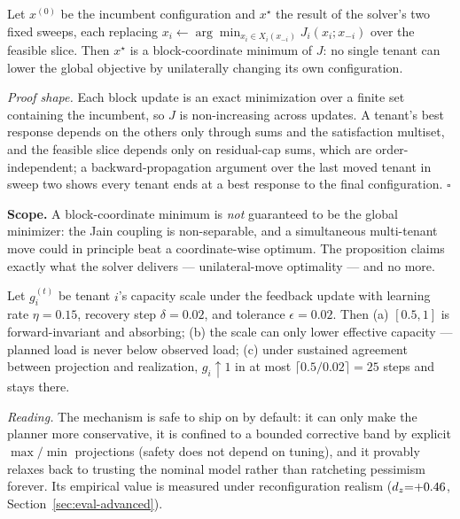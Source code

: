 \begin{proposition}
\label{prop:bco}
Let $x^{(0)}$ be the incumbent configuration and $x^\star$ the result of the
solver's two fixed sweeps, each replacing
$x_i\leftarrow\arg\min_{x_i\in X_i(x_{-i})}J_i(x_i;x_{-i})$ over the feasible
slice. Then $x^\star$ is a block-coordinate minimum of $J$: no single tenant
can lower the global objective by unilaterally changing its own
configuration.
\end{proposition}

\emph{Proof shape.} Each block update is an exact minimization over a finite
set containing the incumbent, so $J$ is non-increasing across updates.
A tenant's best response depends on the others only through sums and the
satisfaction multiset, and the feasible slice depends only on residual-cap
sums, which are order-independent; a backward-propagation argument over the
last moved tenant in sweep two shows every tenant ends at a best response to
the final configuration. $\square$

\textbf{Scope.} A block-coordinate minimum is \emph{not} guaranteed to be
the global minimizer: the Jain coupling is non-separable, and a simultaneous
multi-tenant move could in principle beat a coordinate-wise optimum. The
proposition claims exactly what the solver delivers --- unilateral-move
optimality --- and no more.

\begin{proposition}
\label{prop:calibration}
Let $g_i^{(t)}$ be tenant $i$'s capacity scale under the feedback update
with learning rate $\eta=0.15$, recovery step $\delta=0.02$, and tolerance
$\epsilon=0.02$. Then (a) $[0.5,1]$ is forward-invariant and absorbing;
(b) the scale can only lower effective capacity --- planned load is never
below observed load; (c) under sustained agreement between projection and
realization, $g_i \uparrow 1$ in at most $\lceil 0.5/0.02\rceil = 25$ steps
and stays there.
\end{proposition}

\emph{Reading.} The mechanism is safe to ship on by default: it can only
make the planner more conservative, it is confined to a bounded corrective
band by explicit $\max/\min$ projections (safety does not depend on tuning),
and it provably relaxes back to trusting the nominal model rather than
ratcheting pessimism forever. Its empirical value is measured under
reconfiguration realism ($d_z{=}{+}0.46$, Section~\ref{sec:eval-advanced}).


